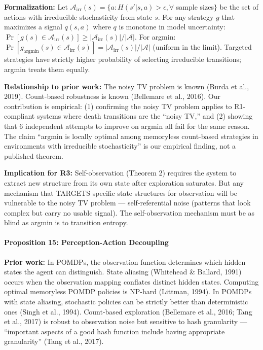 \documentclass[
  11pt,
]{article}
\begin{document}
\textbf{Formalization:} Let
\(\mathcal{A}_{\text{irr}}(s) = \{a : H(s' | s, a) > \epsilon, \forall\)
sample sizes\(\}\) be the set of actions with irreducible stochasticity
from state \(s\). For any strategy \(g\) that maximizes a signal
\(q(s, a)\) where \(q\) is monotone in model uncertainty:
\(\Pr[g(s) \in \mathcal{A}_{\text{irr}}(s)] \geq |\mathcal{A}_{\text{irr}}(s)| / |\mathcal{A}|\).
For argmin:
\(\Pr[g_{\text{argmin}}(s) \in \mathcal{A}_{\text{irr}}(s)] = |\mathcal{A}_{\text{irr}}(s)| / |\mathcal{A}|\)
(uniform in the limit). Targeted strategies have strictly higher
probability of selecting irreducible transitions; argmin treats them
equally.

\textbf{Relationship to prior work:} The noisy TV problem is known
(Burda et al., 2019). Count-based robustness is known (Bellemare et al.,
2016). Our contribution is empirical: (1) confirming the noisy TV
problem applies to R1-compliant systems where death transitions are the
``noisy TV,'' and (2) showing that 6 independent attempts to improve on
argmin all fail for the same reason. The claim ``argmin is locally
optimal among memoryless count-based strategies in environments with
irreducible stochasticity'' is our empirical finding, not a published
theorem.

\textbf{Implication for R3:} Self-observation (Theorem 2) requires the
system to extract new structure from its own state after exploration
saturates. But any mechanism that TARGETS specific state structures for
observation will be vulnerable to the noisy TV problem ---
self-referential noise (patterns that look complex but carry no usable
signal). The self-observation mechanism must be as blind as argmin is to
transition entropy.

\paragraph{Proposition 15: Perception-Action
Decoupling}\label{proposition-15-perception-action-decoupling}

\textbf{Prior work:} In POMDPs, the observation function determines
which hidden states the agent can distinguish. State aliasing (Whitehead
\& Ballard, 1991) occurs when the observation mapping conflates distinct
hidden states. Computing optimal memoryless POMDP policies is NP-hard
(Littman, 1994). In POMDPs with state aliasing, stochastic policies can
be strictly better than deterministic ones (Singh et al., 1994).
Count-based exploration (Bellemare et al., 2016; Tang et al., 2017) is
robust to observation noise but sensitive to hash granularity ---
``important aspects of a good hash function include having appropriate
granularity'' (Tang et al., 2017).
\end{document}
